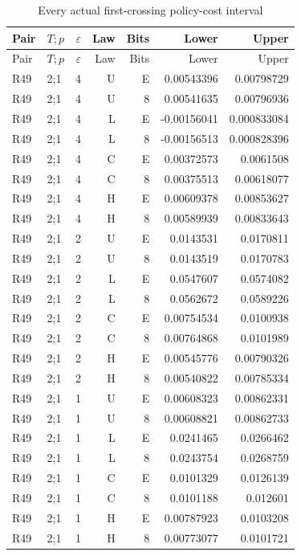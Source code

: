 {\small
\setlength{\tabcolsep}{3.5pt}
\begin{longtable}{@{}llrrrrr@{}}
\caption{Every actual first-crossing policy-cost interval}\label{tab:all-direct49}\\
\toprule
Pair & $T;p$ & $\varepsilon$ & Law & Bits & Lower & Upper \\
\midrule
\endfirsthead
\toprule
Pair & $T;p$ & $\varepsilon$ & Law & Bits & Lower & Upper \\
\midrule
\endhead
\bottomrule
\endfoot
R49 & 2;1 & 4 & U & E & 0.00543396 & 0.00798729 \\
R49 & 2;1 & 4 & U & 8 & 0.00541635 & 0.00796936 \\
R49 & 2;1 & 4 & L & E & -0.00156041 & 0.000833084 \\
R49 & 2;1 & 4 & L & 8 & -0.00156513 & 0.000828396 \\
R49 & 2;1 & 4 & C & E & 0.00372573 & 0.0061508 \\
R49 & 2;1 & 4 & C & 8 & 0.00375513 & 0.00618077 \\
R49 & 2;1 & 4 & H & E & 0.00609378 & 0.00853627 \\
R49 & 2;1 & 4 & H & 8 & 0.00589939 & 0.00833643 \\
R49 & 2;1 & 2 & U & E & 0.0143531 & 0.0170811 \\
R49 & 2;1 & 2 & U & 8 & 0.0143519 & 0.0170783 \\
R49 & 2;1 & 2 & L & E & 0.0547607 & 0.0574082 \\
R49 & 2;1 & 2 & L & 8 & 0.0562672 & 0.0589226 \\
R49 & 2;1 & 2 & C & E & 0.00754534 & 0.0100938 \\
R49 & 2;1 & 2 & C & 8 & 0.00764868 & 0.0101989 \\
R49 & 2;1 & 2 & H & E & 0.00545776 & 0.00790326 \\
R49 & 2;1 & 2 & H & 8 & 0.00540822 & 0.00785334 \\
R49 & 2;1 & 1 & U & E & 0.00608323 & 0.00862331 \\
R49 & 2;1 & 1 & U & 8 & 0.00608821 & 0.00862733 \\
R49 & 2;1 & 1 & L & E & 0.0241465 & 0.0266462 \\
R49 & 2;1 & 1 & L & 8 & 0.0243754 & 0.0268759 \\
R49 & 2;1 & 1 & C & E & 0.0101329 & 0.0126139 \\
R49 & 2;1 & 1 & C & 8 & 0.0101188 & 0.012601 \\
R49 & 2;1 & 1 & H & E & 0.00787923 & 0.0103208 \\
R49 & 2;1 & 1 & H & 8 & 0.00773077 & 0.0101721 \\

\end{longtable}}
